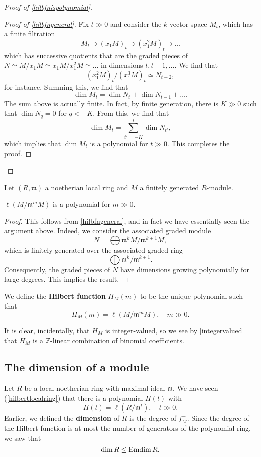 \begin{proof}[Proof of  \cref{hilbfnispolynomial}]
\begin{proof}[Proof of \cref{hilbfngeneral}]
Fix $t \gg 0$ and consider the $k$-vector space $M_t$, which has a finite filtration 
\[ M_t \supset (x_1 M)_t \supset (x_1^2 M)_t \supset \dots  \]
which has successive quotients that are the  graded pieces of $N \simeq
M/x_1 M \simeq x_1 M/x_1^2 M \simeq \dots$ in dimensions $t, t-1, \dots$. We
find that
\[ (x_1^2 M)_t/(x_1^3 M)_t \simeq N_{t-2},  \]
for instance. Summing this, we find that
\[ \dim M_t = \dim N_t + \dim N_{t-1} + \dots . \]
The sum above is actually finite. In fact, by finite generation, there is $K
\gg 0 $ such that $\dim N_q  = 0$ for $q< -K$. From this, we find that 
\[ \dim M_t = \sum_{t' = -K}^{t} \dim N_{t'},  \]
which implies that $\dim M_t$ is a polynomial for $t \gg 0$. This completes
the proof.
\end{proof} 
\end{proof}


Let $(R, \mathfrak{m})$ a noetherian local ring and $M$ a finitely generated
$R$-module. 
\begin{proposition} \label{hilbertlocalring} 
$\ell(M/\mathfrak{m}^m M)$ is a polynomial for $m \gg 0$. 
\end{proposition} 
\begin{proof} 
This follows from \cref{hilbfngeneral}, and in fact we have
essentially seen the argument above. Indeed, we consider the
associated graded module
\[ N = \bigoplus \mathfrak{m}^k M/\mathfrak{m}^{k+1}M , \]
which is finitely generated over the associated graded ring
\[ \bigoplus \mathfrak{m}^k/\mathfrak{m}^{k+1}.  \]
Consequently, the graded pieces of $N$ have dimensions growing polynomially
for large degrees. This implies the result. 

\end{proof} 
\begin{definition} 
We define the \textbf{Hilbert function} $H_M(m)$  to be the unique polynomial
such that 
\[ H_M(m) = \ell(M/ \mathfrak{m}^m M), \quad m \gg 0.  \]
\end{definition} 

It is clear, incidentally, that $H_M$ is integer-valued, so we see by
\cref{integervalued} that $H_M$ is a $\mathbb{Z}$-linear
combination of binomial coefficients.

\subsection{The dimension of a module}
Let $R $ be a local noetherian ring with maximal ideal $\mathfrak{m}$. We
have seen (\cref{hilbertlocalring}) that  there is a polynomial $H(t)$ with
\[ H(t) = \ell(R/\mathfrak{m}^t), \quad t \gg 0.  \]
Earlier, we defined the \textbf{dimension} of $R$ is the degree of $f_M^+$. 
Since the degree of the Hilbert function is at most the number of generators
of the polynomial ring, we saw that 
\[ \dim R \leq \operatorname{Emdim} R.  \]

